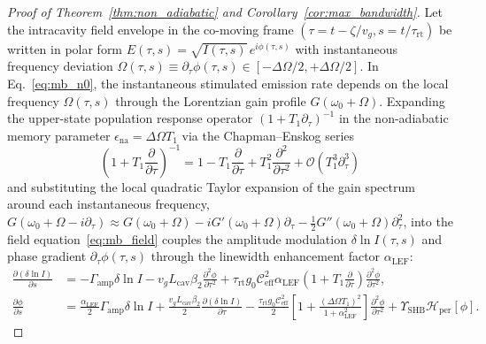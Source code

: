 \documentclass[11pt,letterpaper]{article}
\begin{document}
\begin{proof}[Proof of Theorem~\ref{thm:non_adiabatic} and Corollary~\ref{cor:max_bandwidth}]
Let the intracavity field envelope in the co-moving frame $(\tau = t - \zeta/v_g, s = t/\tau_{\mathrm{rt}})$ be written in polar form $E(\tau, s) = \sqrt{I(\tau, s)}\,e^{i\phi(\tau, s)}$ with instantaneous frequency deviation $\Omega(\tau, s) \equiv \partial_\tau \phi(\tau, s) \in [-\Delta\Omega/2, +\Delta\Omega/2]$. In Eq.~\eqref{eq:mb_n0}, the instantaneous stimulated emission rate depends on the local frequency $\Omega(\tau, s)$ through the Lorentzian gain profile $G(\omega_0 + \Omega)$. Expanding the upper-state population response operator $(1 + T_1 \partial_\tau)^{-1}$ in the non-adiabatic memory parameter $\epsilon_{\mathrm{na}} = \Delta\Omega T_1$ via the Chapman--Enskog series
\begin{equation}
\left(1 + T_1 \frac{\partial}{\partial \tau}\right)^{-1} = 1 - T_1 \frac{\partial}{\partial \tau} + T_1^2 \frac{\partial^2}{\partial \tau^2} + \mathcal{O}(T_1^3 \partial_\tau^3)
\label{eq:appA_ce_series}
\end{equation}
and substituting the local quadratic Taylor expansion of the gain spectrum around each instantaneous frequency, $G(\omega_0 + \Omega - i\partial_\tau) \approx G(\omega_0 + \Omega) - i G'(\omega_0 + \Omega)\partial_\tau - \frac{1}{2}G''(\omega_0 + \Omega)\partial_\tau^2$, into the field equation~\eqref{eq:mb_field} couples the amplitude modulation $\delta\ln I(\tau, s)$ and phase gradient $\partial_\tau \phi(\tau, s)$ through the linewidth enhancement factor $\alpha_{\mathrm{LEF}}$:
\begin{subequations}
\label{eq:appA_coupled}
\begin{align}
\frac{\partial (\delta\ln I)}{\partial s} &= -\Gamma_{\mathrm{amp}}\delta\ln I - v_g L_{\mathrm{cav}}\beta_2 \frac{\partial^2 \phi}{\partial \tau^2} + \tau_{\mathrm{rt}} g_0 \mathcal{C}_{\mathrm{eff}}^2 \alpha_{\mathrm{LEF}}\left(1 + T_1\frac{\partial}{\partial\tau}\right)\frac{\partial^2 \phi}{\partial \tau^2}, \label{eq:appA_amp}\\
\frac{\partial \phi}{\partial s} &= \frac{\alpha_{\mathrm{LEF}}}{2}\Gamma_{\mathrm{amp}}\delta\ln I + \frac{v_g L_{\mathrm{cav}}\beta_2}{2}\frac{\partial (\delta\ln I)}{\partial \tau} - \frac{\tau_{\mathrm{rt}} g_0 \mathcal{C}_{\mathrm{eff}}^2}{2}\left[1 + \frac{(\Delta\Omega T_1)^2}{1 + \alpha_{\mathrm{LEF}}^2}\right]\frac{\partial^2 \phi}{\partial \tau^2} + \Upsilon_{\mathrm{SHB}}\mathcal{H}_{\mathrm{per}}[\phi]. \label{eq:appA_phase}
\end{align}

\end{subequations}
\end{proof}
\end{document}
